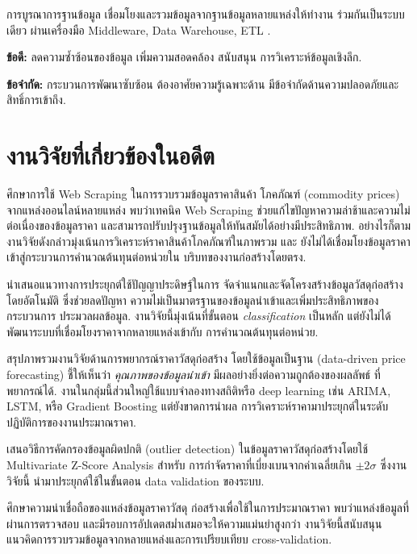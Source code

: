 การบูรณาการฐานข้อมูล เชื่อมโยงและรวมข้อมูลจากฐานข้อมูลหลายแหล่งให้ทำงาน
ร่วมกันเป็นระบบเดียว ผ่านเครื่องมือ Middleware, Data Warehouse, ETL
\cite{cloudflare2025}.

\textbf{ข้อดี:} ลดความซ้ำซ้อนของข้อมูล เพิ่มความสอดคล้อง สนับสนุน
การวิเคราะห์ข้อมูลเชิงลึก.

\textbf{ข้อจำกัด:} กระบวนการพัฒนาซับซ้อน ต้องอาศัยความรู้เฉพาะด้าน
มีข้อจำกัดด้านความปลอดภัยและสิทธิ์การเข้าถึง.

\section{งานวิจัยที่เกี่ยวข้องในอดีต}
\label{sec:related-work}

\textcite{rao2015} ศึกษาการใช้ Web Scraping ในการรวบรวมข้อมูลราคาสินค้า
โภคภัณฑ์ (commodity prices) จากแหล่งออนไลน์หลายแหล่ง พบว่าเทคนิค
Web Scraping ช่วยแก้ไขปัญหาความล่าช้าและความไม่ต่อเนื่องของข้อมูลราคา
และสามารถปรับปรุงฐานข้อมูลให้ทันสมัยได้อย่างมีประสิทธิภาพ. อย่างไรก็ตาม
งานวิจัยดังกล่าวมุ่งเน้นการวิเคราะห์ราคาสินค้าโภคภัณฑ์ในภาพรวม และ
ยังไม่ได้เชื่อมโยงข้อมูลราคาเข้าสู่กระบวนการคำนวณต้นทุนต่อหน่วยใน
บริบทของงานก่อสร้างโดยตรง.

\textcite{chunyaem2019} นำเสนอแนวทางการประยุกต์ใช้ปัญญาประดิษฐ์ในการ
จัดจำแนกและจัดโครงสร้างข้อมูลวัสดุก่อสร้างโดยอัตโนมัติ ซึ่งช่วยลดปัญหา
ความไม่เป็นมาตรฐานของข้อมูลนำเข้าและเพิ่มประสิทธิภาพของกระบวนการ
ประมวลผลข้อมูล. งานวิจัยนี้มุ่งเน้นที่ขั้นตอน \emph{classification}
เป็นหลัก แต่ยังไม่ได้พัฒนาระบบที่เชื่อมโยงราคาจากหลายแหล่งเข้ากับ
การคำนวณต้นทุนต่อหน่วย.

\textcite{liu2024} สรุปภาพรวมงานวิจัยด้านการพยากรณ์ราคาวัสดุก่อสร้าง
โดยใช้ข้อมูลเป็นฐาน (data-driven price forecasting) ชี้ให้เห็นว่า
\emph{คุณภาพของข้อมูลนำเข้า} มีผลอย่างยิ่งต่อความถูกต้องของผลลัพธ์
ที่พยากรณ์ได้. งานในกลุ่มนี้ส่วนใหญ่ใช้แบบจำลองทางสถิติหรือ deep
learning เช่น ARIMA, LSTM, หรือ Gradient Boosting แต่ยังขาดการนำผล
การวิเคราะห์ราคามาประยุกต์ในระดับปฏิบัติการของงานประมาณราคา.

\textcite{lee2024} เสนอวิธีการคัดกรองข้อมูลผิดปกติ (outlier detection)
ในข้อมูลราคาวัสดุก่อสร้างโดยใช้ Multivariate Z-Score Analysis สำหรับ
การกำจัดราคาที่เบี่ยงเบนจากค่าเฉลี่ยเกิน $\pm 2\sigma$ ซึ่งงานวิจัยนี้
นำมาประยุกต์ใช้ในขั้นตอน data validation ของระบบ.

\textcite{elmohr2022} ศึกษาความน่าเชื่อถือของแหล่งข้อมูลราคาวัสดุ
ก่อสร้างเพื่อใช้ในการประมาณราคา พบว่าแหล่งข้อมูลที่ผ่านการตรวจสอบ
และมีรอบการอัปเดตสม่ำเสมอจะให้ความแม่นยำสูงกว่า งานวิจัยนี้สนับสนุน
แนวคิดการรวบรวมข้อมูลจากหลายแหล่งและการเปรียบเทียบ cross-validation.

